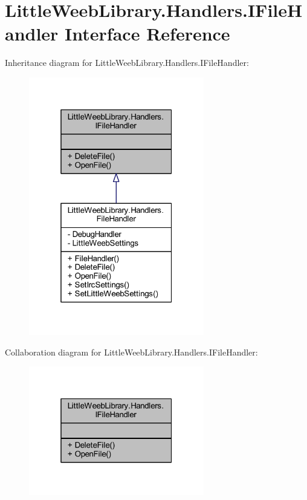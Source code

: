 \hypertarget{interface_little_weeb_library_1_1_handlers_1_1_i_file_handler}{}\section{Little\+Weeb\+Library.\+Handlers.\+I\+File\+Handler Interface Reference}
\label{interface_little_weeb_library_1_1_handlers_1_1_i_file_handler}


Inheritance diagram for Little\+Weeb\+Library.\+Handlers.\+I\+File\+Handler\+:\nopagebreak
\begin{figure}[H]
\begin{center}
\leavevmode
\includegraphics[width=217pt]{interface_little_weeb_library_1_1_handlers_1_1_i_file_handler__inherit__graph}
\end{center}
\end{figure}


Collaboration diagram for Little\+Weeb\+Library.\+Handlers.\+I\+File\+Handler\+:\nopagebreak
\begin{figure}[H]
\begin{center}
\leavevmode
\includegraphics[width=217pt]{interface_little_weeb_library_1_1_handlers_1_1_i_file_handler__coll__graph}
\end{center}
\end{figure}
